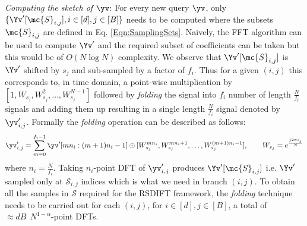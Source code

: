 \begin{enumerate}
\textit{Computing the sketch of $\yv$}: For every new query $\yv$, only $\{\Yv'[\mc{S}_{i,j}],i\in[d],j\in[B]\}$ needs to be computed where the subsets $\mc{S}_{i,j}$ are defined in Eq. \eqref{Eqn:SamplingSets}. Naively, the FFT algorithm can be used to compute $\Yv'$ and the required subset of coefficients can be taken but this would be of $O(N \log N)$ complexity. We observe that $\Yv'[\mc{S}_{i,j}]$ is $\Yv'$ shifted by $s_j$ and sub-sampled by a factor of $f_i$. Thus for a given $(i,j)$ this corresponds to, in time domain, a point-wise multiplication by $[1,W_{s_j},W_{s_j}^2,\ldots,W_{s_j}^{N-1}]$ followed by \textit{folding} the signal into $f_i$ number of length $\frac{N}{f_i}$ signals and adding them up resulting in a single length $\frac{N}{f_i}$ signal denoted by $\yv'_{i,j}$. Formally the \textit{folding} operation can be described as follows:
	  \begin{equation}
	  	\yv'_{i,j} = \sum \limits_{m = 0}^{f_i-1} \yv'[mn_i:(m+1)n_i-1] \odot [W_{s_j}^{mn_i},W_{s_j}^{mn_i+1},\ldots, W_{s_j}^{(m+1)n_i-1}],\qquad W_{s_j}=e^{\frac{j2\pi s_j}{N}}
	  \end{equation}
	  where $n_i=\frac{N}{f_i}$. Taking $n_i$-point DFT of $\yv'_{i,j}$ produces $\Yv'[\mc{S}_{i,j}]$ i.e. $\Yv'$ sampled only at $\mathcal{S}_{i,j}$ indices which is what we need in branch $(i,j)$. To obtain all the samples in $\mathcal{S}$ required for the RSDIFT framework, the \textit{folding} technique needs to be carried out for each $(i,j)$, for $i\in[d],j\in[B]$, a total of $\approx dB~~ N^{1-\alpha}$-point DFTs.
\end{enumerate}


